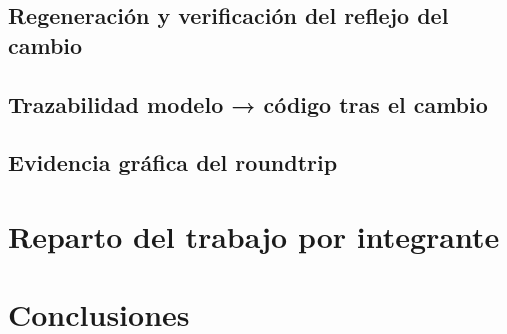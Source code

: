 \documentclass[11pt,a4paper]{article}
\begin{document}
\subsection{Regeneración y verificación del reflejo del cambio}

\subsection{Trazabilidad modelo → código tras el cambio}

\subsection{Evidencia gráfica del roundtrip}

\section{Reparto del trabajo por integrante}

\section{Conclusiones}


\newpage


\end{document}
